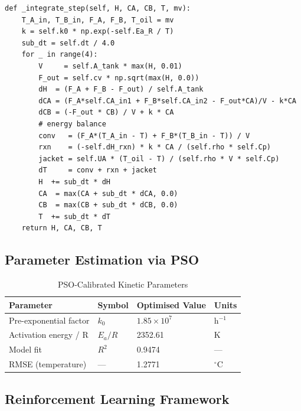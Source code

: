 \documentclass[12pt,a4paper]{article}
\begin{document}
\begin{lstlisting}[style=python, caption={Energy-balance integration (4-step sub-stepping).}]
def _integrate_step(self, H, CA, CB, T, mv):
    T_A_in, T_B_in, F_A, F_B, T_oil = mv
    k = self.k0 * np.exp(-self.Ea_R / T)
    sub_dt = self.dt / 4.0
    for _ in range(4):
        V     = self.A_tank * max(H, 0.01)
        F_out = self.cv * np.sqrt(max(H, 0.0))
        dH  = (F_A + F_B - F_out) / self.A_tank
        dCA = (F_A*self.CA_in1 + F_B*self.CA_in2 - F_out*CA)/V - k*CA
        dCB = (-F_out * CB) / V + k * CA
        # energy balance
        conv   = (F_A*(T_A_in - T) + F_B*(T_B_in - T)) / V
        rxn    = (-self.dH_rxn) * k * CA / (self.rho * self.Cp)
        jacket = self.UA * (T_oil - T) / (self.rho * V * self.Cp)
        dT     = conv + rxn + jacket
        H  += sub_dt * dH
        CA  = max(CA + sub_dt * dCA, 0.0)
        CB  = max(CB + sub_dt * dCB, 0.0)
        T  += sub_dt * dT
    return H, CA, CB, T
\end{lstlisting}

\subsection{Parameter Estimation via PSO}

\begin{table}[H]
  \centering
  \caption{PSO-Calibrated Kinetic Parameters}
  \label{tab:pso}
  \renewcommand{\arraystretch}{1.3}
  \begin{tabular}{@{}llll@{}}
    \toprule
    \textbf{Parameter} & \textbf{Symbol} & \textbf{Optimised Value} & \textbf{Units} \\
    \midrule
    Pre-exponential factor  & $k_0$   & $1.85\times10^7$ & h$^{-1}$ \\
    Activation energy / R   & $E_a/R$ & 2352.61          & K \\
    Model fit               & $R^2$   & 0.9474           & --- \\
    RMSE (temperature)      & ---     & 1.2771           & $^\circ$C \\
    \bottomrule
  \end{tabular}
\end{table}

\subsection{Reinforcement Learning Framework}
\end{document}
